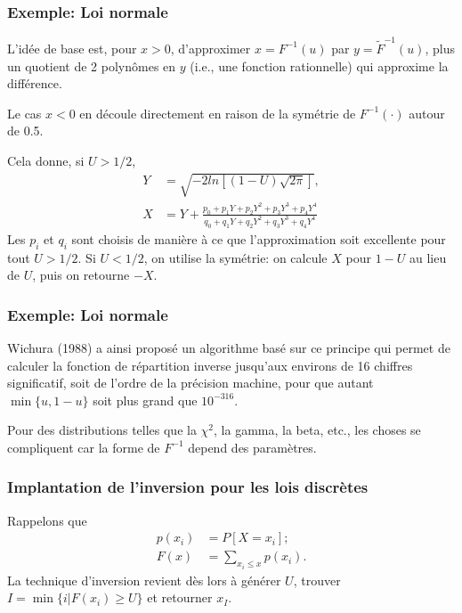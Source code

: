 \documentclass[t,usepdftitle=false]{beamer}
\begin{document}
\begin{frame}
\frametitle{Exemple: Loi normale}

L'idée de base est, pour $x > 0$, d'approximer $x = F^{-1}(u)$ par $y =
\tilde{F}^{-1}(u)$, plus un quotient de 2 polynômes en $y$ (i.e., une fonction
rationnelle) qui approxime la différence.

\mbox{}

Le cas $x < 0$ en découle directement en raison de la symétrie de
$F^{-1}(\cdot)$ autour de 0.5.

\mbox{}

Cela donne, si $U > 1/2$,
\begin{align*}
Y & = \sqrt{- 2 ln[(1 - U )\sqrt{2\pi}]},\\
X & = Y + \frac{p_0 + p_1 Y + p_2 Y^2 + p_3 Y^3 + p_4 Y^4}
{q_0 + q_1 Y + q_2 Y^2 + q_3 Y^3 + q_4 Y^4}
\end{align*}
Les $p_i$ et $q_i$ sont choisis de manière à ce que l'approximation
soit excellente pour tout $U > 1/2$.
Si $U < 1/2$, on utilise la symétrie: on calcule $X$ pour $1 - U$ au
lieu de $U$, puis on retourne $-X$.

\end{frame}

\begin{frame}
\frametitle{Exemple: Loi normale}

Wichura (1988) a ainsi proposé un algorithme basé sur ce
principe qui permet de calculer la fonction de répartition inverse
jusqu'aux environs de 16 chiffres significatif, soit de l'ordre de la
précision machine, pour que autant $\min \lbrace u, 1-u \rbrace$ soit plus grand que $10^{-316}$.


\mbox{}

Pour des distributions telles que la $\chi^2$, la gamma, la beta, etc., les choses se compliquent car la forme de $F^{-1}$ depend des paramètres.

\end{frame}

\begin{frame}
\frametitle{Implantation de l'inversion pour les lois discrètes}

Rappelons que
\begin{align*}
p(x_i) & = P [X = x_i];\\
F (x) & = \sum_{x_i \leq x} p(x_i).
\end{align*}
La technique d'inversion revient dès lors à générer $U$,
trouver $I = \min \lbrace i | F (x_i)  \geq U \rbrace$ et retourner $x_I$.

\end{frame}
\end{document}
